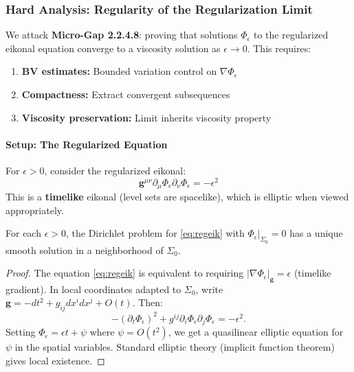 \subsubsection{Hard Analysis: Regularity of the Regularization Limit}\label{subsec:RegularityLimit}

We attack \textbf{Micro-Gap 2.2.4.8}: proving that solutions $\Phi_\epsilon$ to the regularized eikonal equation converge to a viscosity solution as $\epsilon \to 0$. This requires:
\begin{enumerate}
    \item[(A)] \textbf{BV estimates:} Bounded variation control on $\nabla\Phi_\epsilon$
    \item[(B)] \textbf{Compactness:} Extract convergent subsequences
    \item[(C)] \textbf{Viscosity preservation:} Limit inherits viscosity property
\end{enumerate}

\paragraph{Setup: The Regularized Equation}

For $\epsilon > 0$, consider the regularized eikonal:
\begin{equation}\label{eq:regeik}
    \mathbf{g}^{\mu\nu}\partial_\mu\Phi_\epsilon\partial_\nu\Phi_\epsilon = -\epsilon^2
\end{equation}
This is a \textbf{timelike} eikonal (level sets are spacelike), which is elliptic when viewed appropriately.

\begin{lemma}\label{lem:regexist}
For each $\epsilon > 0$, the Dirichlet problem for \eqref{eq:regeik} with $\Phi_\epsilon|_{\Sigma_0} = 0$ has a unique smooth solution in a neighborhood of $\Sigma_0$.
\end{lemma}

\begin{proof}
The equation \eqref{eq:regeik} is equivalent to requiring $|\nabla\Phi_\epsilon|_{\mathbf{g}} = \epsilon$ (timelike gradient). In local coordinates adapted to $\Sigma_0$, write $\mathbf{g} = -dt^2 + g_{ij}dx^idx^j + O(t)$. Then:
\[
-(\partial_t\Phi_\epsilon)^2 + g^{ij}\partial_i\Phi_\epsilon\partial_j\Phi_\epsilon = -\epsilon^2.
\]
Setting $\Phi_\epsilon = \epsilon t + \psi$ where $\psi = O(t^2)$, we get a quasilinear elliptic equation for $\psi$ in the spatial variables. Standard elliptic theory (implicit function theorem) gives local existence.
\end{proof}

